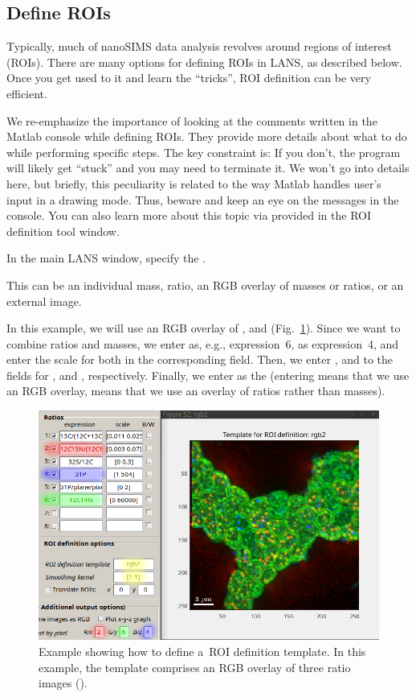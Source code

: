 \subsection{Define ROIs}
\setcounter{step}{0}

Typically, much of nanoSIMS data analysis revolves around regions of interest (ROIs). There are many options for defining ROIs in LANS, as described below. Once you get used to it and learn the ``tricks'', ROI definition can be very efficient. 

We re-emphasize the importance of looking at the comments written in the Matlab console while defining ROIs. They provide more details about what to do while performing specific steps. The key constraint is:  If you don't, the program will likely get ``stuck'' and you may need to terminate it. We won't go into details here, but briefly, this peculiarity is related to the way Matlab handles user's input in a drawing mode. Thus, beware and keep an eye on the messages in the console. You can also learn more about this topic via  provided in the ROI definition tool window.

\s In the main LANS window, specify the . 

\bul This can be an individual mass, ratio, an RGB overlay of masses or ratios, or an external image.

\bul In this example, we will use an RGB overlay of ,  and  (Fig.~\ref{fig:roi-template}). Since we want to combine ratios and masses, we enter  as, e.g., expression~6,  as expression~4, and enter the scale for both in the corresponding  field. Then, we enter ,  and  to the fields for ,  and , respectively. Finally, we enter  as the  (entering  means that we use an RGB overlay,  means that we use an overlay of ratios rather than masses).

\begin{figure}[!ht]
\centering
\includegraphics[scale=0.4]{figs3/LANS-roi-template}
\caption{\label{fig:roi-template}%
Example showing how to define a~ROI definition template. In this example, the template comprises an RGB overlay of three ratio images ().}
\end{figure}

